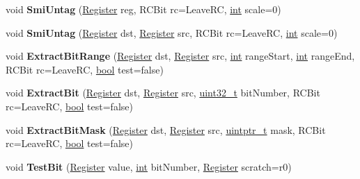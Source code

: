 \begin{DoxyCompactItemize}
void {\bfseries Smi\+Untag} (\mbox{\hyperlink{classv8_1_1internal_1_1Register}{Register}} reg, R\+C\+Bit rc=Leave\+RC, \mbox{\hyperlink{classint}{int}} scale=0)
\item 
\mbox{\label{classv8_1_1internal_1_1TurboAssembler_ac6c024799f29f96bcc74899d34e8c3a6}} 
void {\bfseries Smi\+Untag} (\mbox{\hyperlink{classv8_1_1internal_1_1Register}{Register}} dst, \mbox{\hyperlink{classv8_1_1internal_1_1Register}{Register}} src, R\+C\+Bit rc=Leave\+RC, \mbox{\hyperlink{classint}{int}} scale=0)
\item 
\mbox{\label{classv8_1_1internal_1_1TurboAssembler_a5761214cc803b24b2f22fc17667ec63e}} 
void {\bfseries Extract\+Bit\+Range} (\mbox{\hyperlink{classv8_1_1internal_1_1Register}{Register}} dst, \mbox{\hyperlink{classv8_1_1internal_1_1Register}{Register}} src, \mbox{\hyperlink{classint}{int}} range\+Start, \mbox{\hyperlink{classint}{int}} range\+End, R\+C\+Bit rc=Leave\+RC, \mbox{\hyperlink{classbool}{bool}} test=false)
\item 
\mbox{\label{classv8_1_1internal_1_1TurboAssembler_a223484a0b0b68ac1bf2799ea5f07f460}} 
void {\bfseries Extract\+Bit} (\mbox{\hyperlink{classv8_1_1internal_1_1Register}{Register}} dst, \mbox{\hyperlink{classv8_1_1internal_1_1Register}{Register}} src, \mbox{\hyperlink{classuint32__t}{uint32\+\_\+t}} bit\+Number, R\+C\+Bit rc=Leave\+RC, \mbox{\hyperlink{classbool}{bool}} test=false)
\item 
\mbox{\label{classv8_1_1internal_1_1TurboAssembler_a5912b4efef2c9b3deae1a91600995bd2}} 
void {\bfseries Extract\+Bit\+Mask} (\mbox{\hyperlink{classv8_1_1internal_1_1Register}{Register}} dst, \mbox{\hyperlink{classv8_1_1internal_1_1Register}{Register}} src, \mbox{\hyperlink{classuintptr__t}{uintptr\+\_\+t}} mask, R\+C\+Bit rc=Leave\+RC, \mbox{\hyperlink{classbool}{bool}} test=false)
\item 
\mbox{\label{classv8_1_1internal_1_1TurboAssembler_a142e9f6529cb78da4e5833de201143b7}} 
void {\bfseries Test\+Bit} (\mbox{\hyperlink{classv8_1_1internal_1_1Register}{Register}} value, \mbox{\hyperlink{classint}{int}} bit\+Number, \mbox{\hyperlink{classv8_1_1internal_1_1Register}{Register}} scratch=r0)

\end{DoxyCompactItemize}
